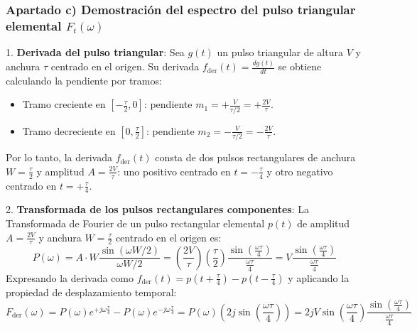 \begin{resolucion}
\vspace{0.3cm}

\subsubsection*{Apartado c) Demostración del espectro del pulso triangular elemental $F_t(\omega)$}

1. \textbf{Derivada del pulso triangular}:
   Sea $g(t)$ un pulso triangular de altura $V$ y anchura $\tau$ centrado en el origen. Su derivada $f_{\text{der}}(t) = \frac{dg(t)}{dt}$ se obtiene calculando la pendiente por tramos:
   \begin{itemize}[leftmargin=*]
       \item Tramo creciente en $\left[-\frac{\tau}{2}, 0\right]$: pendiente $m_1 = +\frac{V}{\tau/2} = +\frac{2V}{\tau}$.
       \item Tramo decreciente en $\left[0, \frac{\tau}{2}\right]$: pendiente $m_2 = -\frac{V}{\tau/2} = -\frac{2V}{\tau}$.
   \end{itemize}
   Por lo tanto, la derivada $f_{\text{der}}(t)$ consta de dos pulsos rectangulares de anchura $W = \frac{\tau}{2}$ y amplitud $A = \frac{2V}{\tau}$: uno positivo centrado en $t = -\frac{\tau}{4}$ y otro negativo centrado en $t = +\frac{\tau}{4}$.

2. \textbf{Transformada de los pulsos rectangulares componentes}:
   La Transformada de Fourier de un pulso rectangular elemental $p(t)$ de amplitud $A = \frac{2V}{\tau}$ y anchura $W = \frac{\tau}{2}$ centrado en el origen es:
   \[
   P(\omega) = A \cdot W \frac{\sin(\omega W / 2)}{\omega W / 2} = \left(\frac{2V}{\tau}\right) \left(\frac{\tau}{2}\right) \frac{\sin\left(\frac{\omega\tau}{4}\right)}{\frac{\omega\tau}{4}} = V \frac{\sin\left(\frac{\omega\tau}{4}\right)}{\frac{\omega\tau}{4}}
   \]
   Expresando la derivada como $f_{\text{der}}(t) = p\left(t + \frac{\tau}{4}\right) - p\left(t - \frac{\tau}{4}\right)$ y aplicando la propiedad de desplazamiento temporal:
   \[
   F_{\text{der}}(\omega) = P(\omega) e^{+j\omega \frac{\tau}{4}} - P(\omega) e^{-j\omega \frac{\tau}{4}} = P(\omega) \left( 2j \sin\left(\frac{\omega\tau}{4}\right) \right) = 2j V \sin\left(\frac{\omega\tau}{4}\right) \frac{\sin\left(\frac{\omega\tau}{4}\right)}{\frac{\omega\tau}{4}}
   \]


\end{resolucion}
